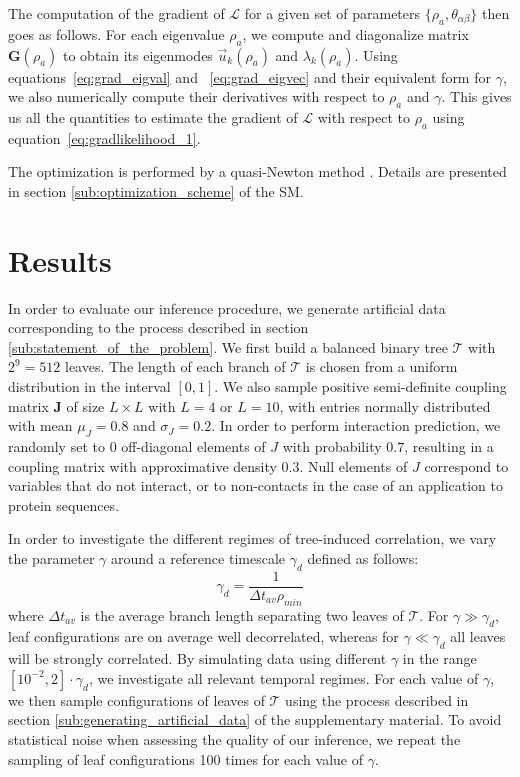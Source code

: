 \documentclass[preprint,amsmath,amssymb,superscriptaddress,showpacs,pre]{revtex4-1}
\begin{document}
The computation of the gradient of $\mathcal{L}$ for a given set of parameters $\{\rho_a, \theta_{\alpha\beta}\}$ then goes as follows. 
For each eigenvalue $\rho_a$, we compute and diagonalize matrix $\bm{G}(\rho_a)$ to obtain its eigenmodes $\vec{u}_k(\rho_a)$ and $\lambda_k(\rho_a)$. 
Using equations~\ref{eq:grad_eigval} and ~\ref{eq:grad_eigvec} and their equivalent form for $\gamma$, we also numerically compute their derivatives with respect to $\rho_a$ and $\gamma$. 
This gives us all the quantities to estimate the gradient of $\mathcal{L}$ with respect to $\rho_a$ using equation~\ref{eq:gradlikelihood_1}.

 The optimization is performed by a quasi-Newton method \cite{NLopt}. Details are presented in section \ref{sub:optimization_scheme} of the SM. 




\section{Results}
\label{sec:Results}

In order to evaluate our inference procedure, we generate artificial data corresponding to the process described in section \ref{sub:statement_of_the_problem}. 
We first build a  balanced binary tree $\mathcal{T}$ with $2^9=512$ leaves. 
The length of each branch of $\mathcal{T}$ is chosen from a uniform distribution in the interval $[0,1]$. 
We also sample positive semi-definite coupling matrix $\bm{J}$ of size $L\times L$ with $L=4$ or $L=10$, with entries normally distributed with mean $\mu_J=0.8$ and $\sigma_J=0.2$. 
In order to perform interaction prediction, we randomly set to $0$ off-diagonal elements of $J$ with probability $0.7$, resulting in a coupling matrix with approximative density $0.3$.  
Null elements of $J$ correspond to variables that do not interact, or to non-contacts in the case of an application to protein sequences.  


In order to investigate the different regimes of tree-induced correlation, we vary the parameter $\gamma$ around a reference timescale $\gamma_d$ defined as follows: 
\begin{equation}
    \gamma_d = \frac{1}{\Delta t_{av}\rho_{min}} 
\end{equation}
where $\Delta t_{av}$ is the average branch length separating two leaves of $\mathcal{T}$. 
For $\gamma \gg \gamma_d$, leaf configurations are on average well decorrelated, whereas for $\gamma \ll \gamma_d$ all leaves will be strongly correlated. 
By simulating data using different $\gamma$ in the range $[10^{-2},2]\cdot\gamma_d$, we investigate all relevant temporal regimes.  
For each value of $\gamma$, we then sample  configurations of leaves of $\mathcal{T}$ using the process described in section \ref{sub:generating_artificial_data} of the supplementary material. 
To avoid statistical noise when assessing the quality of our inference, we repeat the sampling of leaf configurations 100 times for each value of $\gamma$.
\end{document}
